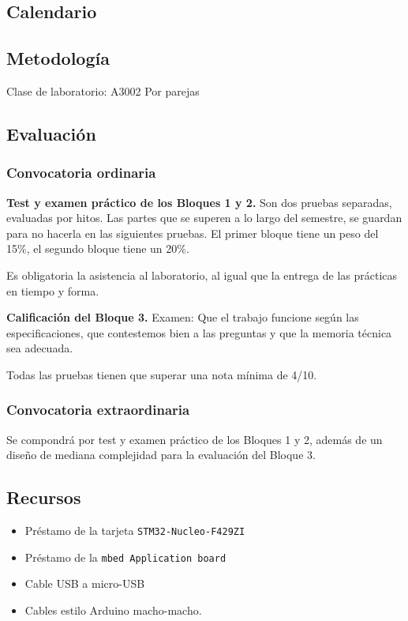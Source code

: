 \documentclass[10pt]{article}
\begin{document}
\subsection{Calendario}

\subsection{Metodología}

Clase de laboratorio: A3002
Por parejas

\subsection{Evaluación}

\subsubsection{Convocatoria ordinaria}
\textbf{Test y examen práctico de los Bloques 1 y 2.} Son dos pruebas separadas, evaluadas por hitos. Las partes que se superen a lo largo del semestre, se guardan para no hacerla en las siguientes pruebas. El primer bloque tiene un peso del 15\%, el segundo bloque tiene un 20\%.

Es obligatoria la asistencia al laboratorio, al igual que la entrega de las prácticas en tiempo y forma.

\textbf{Calificación del Bloque 3.} Examen: Que el trabajo funcione según las especificaciones, que contestemos bien a las preguntas y que la memoria técnica sea adecuada.

Todas las pruebas tienen que superar una nota mínima de 4/10.

\subsubsection{Convocatoria extraordinaria}
Se compondrá por test y examen práctico de los Bloques 1 y 2, además de un diseño de mediana complejidad para la evaluación del Bloque 3.

\subsection{Recursos}

\begin{itemize}
  \item Préstamo de la tarjeta \verb|STM32-Nucleo-F429ZI|
  \item Préstamo de la \verb|mbed Application board|
  \item Cable USB a micro-USB
  \item Cables estilo Arduino macho-macho.
\end{itemize}
\end{document}
